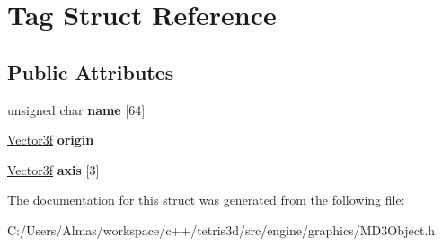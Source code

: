 \hypertarget{struct_tag}{\section{Tag Struct Reference}
\label{struct_tag}
}
\subsection*{Public Attributes}
\begin{DoxyCompactItemize}
\item 
\hypertarget{struct_tag_ae437879c19f50ddbc27b14466187d665}{unsigned char {\bfseries name} \mbox{[}64\mbox{]}}\label{struct_tag_ae437879c19f50ddbc27b14466187d665}

\item 
\hypertarget{struct_tag_a7a73c64f39539149d24326cbbfb764c7}{\hyperlink{struct_vector3f}{Vector3f} {\bfseries origin}}\label{struct_tag_a7a73c64f39539149d24326cbbfb764c7}

\item 
\hypertarget{struct_tag_a4a27a7d7e95fe4541c7c84e5066d0a18}{\hyperlink{struct_vector3f}{Vector3f} {\bfseries axis} \mbox{[}3\mbox{]}}\label{struct_tag_a4a27a7d7e95fe4541c7c84e5066d0a18}

\end{DoxyCompactItemize}


The documentation for this struct was generated from the following file\-:\begin{DoxyCompactItemize}
\item 
C\-:/\-Users/\-Almas/workspace/c++/tetris3d/src/engine/graphics/M\-D3\-Object.\-h\end{DoxyCompactItemize}
